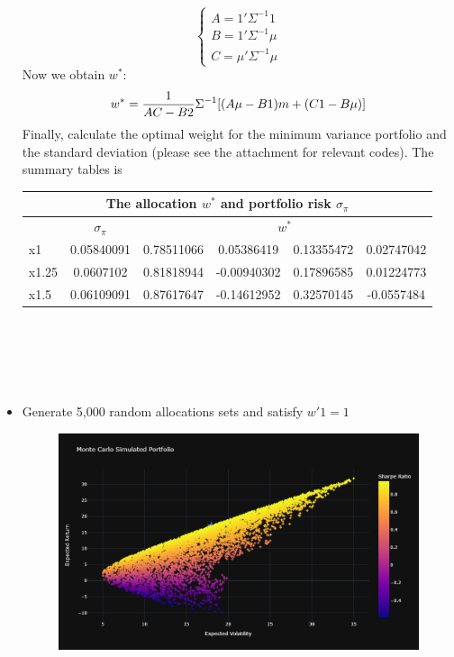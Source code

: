 \documentclass[UTF8]{ctexart}
\begin{document}
\begin{itemize}
\begin{equation}
		      \begin{cases}
			      A = 1'\Sigma^{-1} 1   \\
			      B = 1'\Sigma^{-1} \mu \\
			      C = \mu'\Sigma^{-1} \mu
		      \end{cases}
	      \end{equation}
	      Now we obtain $w^*$:
	      \begin{equation}\label{7}
		      w^* = \frac{1}{AC-B2}\Sigma^{-1}[(A\mu - B1)m + (C1 - B\mu)]
		      \vspace{2ex}
	      \end{equation}
	      Finally, calculate the optimal weight for the minimum variance portfolio and the standard deviation (please see the attachment for relevant codes). The summary tables is
	      \begin{table}[ht] \centering
		      \begin{tabular}{@{}lccccc@{}}
			      \toprule
			      \multicolumn{6}{c}{The allocation $w^*$ and portfolio risk $\sigma_\pi$}                 \\ \midrule
			            & $\sigma_\pi$ & \multicolumn{4}{c}{$w^*$}                                         \\
			      x1    & 0.05840091   & 0.78511066                & 0.05386419  & 0.13355472 & 0.02747042 \\
			      x1.25 & 0.0607102    & 0.81818944                & -0.00940302 & 0.17896585 & 0.01224773 \\
			      x1.5  & 0.06109091   & 0.87617647                & -0.14612952 & 0.32570145 & -0.0557484 \\ \bottomrule
		      \end{tabular}
	      \end{table}
	      \\
	      \\
	      \\
	      \\
	\item Generate 5,000 random allocations sets and satisfy $w'1 = 1$
	      \begin{figure}[ht]
		      \centering\includegraphics[scale=0.4]{1.3.png}
	      \end{figure}
\end{itemize}
\end{document}
